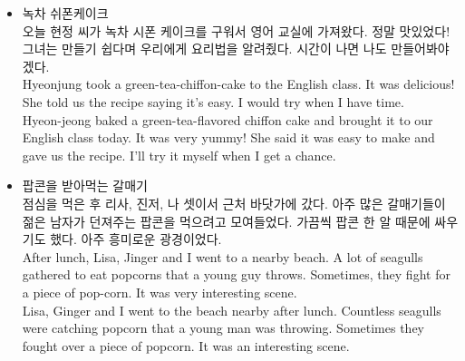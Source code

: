 \begin{itemize}
  \item 녹차 쉬폰케이크\\
  
  오늘 현정 씨가 녹차 시폰 케이크를 구워서 영어 교실에 가져왔다. 정말 맛있었다! 그녀는 만들기 쉽다며 우리에게 요리법을 알려줬다. 시간이 나면 나도 만들어봐야겠다.\\
  
  Hyeonjung took a green-tea-chiffon-cake to the English class. It was delicious! She told us the recipe saying it's easy. I would try when I have time.\\
  
  Hyeon-jeong baked a green-tea-flavored chiffon cake and brought it to our English class today. It was very yummy! She said it was easy to make and gave us the recipe. I'll try it myself when I get a chance.\\
  
  \item 팝콘을 받아먹는 갈매기\\
  
  점심을 먹은 후 리사, 진저, 나 셋이서 근처 바닷가에 갔다. 아주 많은 갈매기들이 젊은 남자가 던져주는 팝콘을 먹으려고 모여들었다. 가끔씩 팝콘 한 알 때문에 싸우기도 했다. 아주 흥미로운 광경이었다.\\
  
  After lunch, Lisa, Jinger and I went to a nearby beach. A lot of seagulls gathered to eat popcorns that a young guy throws. Sometimes, they fight for a piece of pop-corn. It was very interesting scene.\\
  
  Lisa, Ginger and I went to the beach nearby after lunch. Countless seagulls were catching popcorn that a young man was throwing. Sometimes they fought over a piece of popcorn. It was an interesting scene.\\
  
\end{itemize}